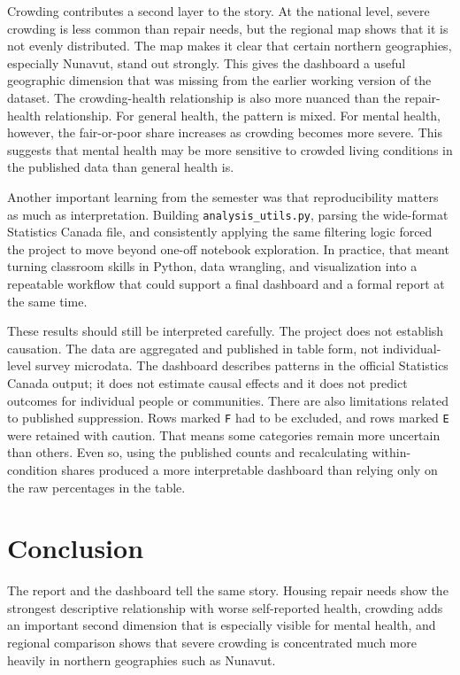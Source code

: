 \documentclass[conference]{IEEEtran}
\begin{document}
Crowding contributes a second layer to the story. At the national level, severe crowding is less common than repair needs, but the regional map shows that it is not evenly distributed. The map makes it clear that certain northern geographies, especially Nunavut, stand out strongly. This gives the dashboard a useful geographic dimension that was missing from the earlier working version of the dataset. The crowding-health relationship is also more nuanced than the repair-health relationship. For general health, the pattern is mixed. For mental health, however, the fair-or-poor share increases as crowding becomes more severe. This suggests that mental health may be more sensitive to crowded living conditions in the published data than general health is.

Another important learning from the semester was that reproducibility matters as much as interpretation. Building \texttt{analysis\_utils.py}, parsing the wide-format Statistics Canada file, and consistently applying the same filtering logic forced the project to move beyond one-off notebook exploration. In practice, that meant turning classroom skills in Python, data wrangling, and visualization into a repeatable workflow that could support a final dashboard and a formal report at the same time.

These results should still be interpreted carefully. The project does not establish causation. The data are aggregated and published in table form, not individual-level survey microdata. The dashboard describes patterns in the official Statistics Canada output; it does not estimate causal effects and it does not predict outcomes for individual people or communities. There are also limitations related to published suppression. Rows marked \texttt{F} had to be excluded, and rows marked \texttt{E} were retained with caution. That means some categories remain more uncertain than others. Even so, using the published counts and recalculating within-condition shares produced a more interpretable dashboard than relying only on the raw percentages in the table.

\section{Conclusion}

The report and the dashboard tell the same story. Housing repair needs show the strongest descriptive relationship with worse self-reported health, crowding adds an important second dimension that is especially visible for mental health, and regional comparison shows that severe crowding is concentrated much more heavily in northern geographies such as Nunavut.
\end{document}
